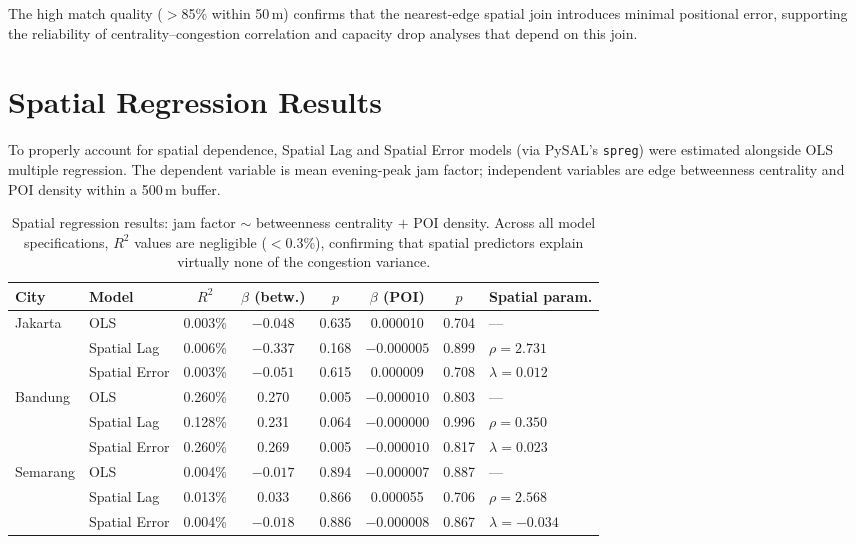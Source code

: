 \documentclass[preprint,12pt]{elsarticle}
\begin{document}
The high match quality ($>$85\% within 50\,m) confirms that the nearest-edge spatial join introduces minimal positional error, supporting the reliability of centrality--congestion correlation and capacity drop analyses that depend on this join.

\section{Spatial Regression Results}
\label{sec:s5}

To properly account for spatial dependence, Spatial Lag and Spatial Error models (via PySAL's \texttt{spreg}) were estimated alongside OLS multiple regression. The dependent variable is mean evening-peak jam factor; independent variables are edge betweenness centrality and POI density within a 500\,m buffer.

\begin{table}[!htbp]
\centering
\caption{Spatial regression results: jam factor $\sim$ betweenness centrality $+$ POI density. Across all model specifications, $R^2$ values are negligible ($<$0.3\%), confirming that spatial predictors explain virtually none of the congestion variance.}
\label{tab:s5}
\small
\begin{tabular}{llcccccl}
\toprule
City & Model & $R^2$ & $\beta$ (betw.) & $p$ & $\beta$ (POI) & $p$ & Spatial param. \\
\midrule
\multirow{3}{*}{Jakarta}
 & OLS           & 0.003\% & $-0.048$ & 0.635 & 0.000010  & 0.704 & ---              \\
 & Spatial Lag   & 0.006\% & $-0.337$ & 0.168 & $-0.000005$ & 0.899 & $\rho = 2.731$   \\
 & Spatial Error & 0.003\% & $-0.051$ & 0.615 & 0.000009  & 0.708 & $\lambda = 0.012$ \\
\midrule
\multirow{3}{*}{Bandung}
 & OLS           & 0.260\% & 0.270    & 0.005 & $-0.000010$ & 0.803 & ---              \\
 & Spatial Lag   & 0.128\% & 0.231    & 0.064 & $-0.000000$ & 0.996 & $\rho = 0.350$   \\
 & Spatial Error & 0.260\% & 0.269    & 0.005 & $-0.000010$ & 0.817 & $\lambda = 0.023$ \\
\midrule
\multirow{3}{*}{Semarang}
 & OLS           & 0.004\% & $-0.017$ & 0.894 & $-0.000007$ & 0.887 & ---              \\
 & Spatial Lag   & 0.013\% & 0.033    & 0.866 & 0.000055  & 0.706 & $\rho = 2.568$   \\
 & Spatial Error & 0.004\% & $-0.018$ & 0.886 & $-0.000008$ & 0.867 & $\lambda = -0.034$ \\
\bottomrule
\end{tabular}
\end{table}
\end{document}
